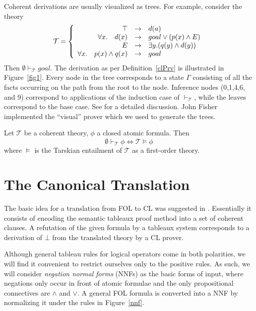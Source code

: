 \documentclass[a4paper,11pt]{article}
\begin{document}
\begin{ex}
Coherent derivations are usually visualized as trees.  For example, consider
the theory
\[ \mathcal T = \left\{
\begin{array}{r r l}
\top &\to &d(a)\\
\forall x.\quad d(x) &\to &goal \lor (p(x) \land E)\\
E &\to &\exists y. (q(y) \land d(y))\\
\forall x.\quad p(x) \land q(x) &\to &goal
\end{array}
\right.
\]
Then $\emptyset \vdash_{\mathcal T} goal$.  The derivation as per Definition~\ref{clPrv}
is illustrated in Figure~\ref{fig1}.  Every node in the tree corresponds to a state
$\Gamma$ consisting of all the facts occurring on the path from the root to the node. 
Inference nodes (0,1,4,6, and 9) correspond to applications of the induction case of 
$\vdash_{\mathcal T}$,
while the leaves correspond to the base case.  See \cite{FishBez09} for a detailed
discussion.
John Fisher implemented the ``visual'' prover which we used to generate the trees.
\end{ex}

\begin{fact}
Let $\mathcal T$ be a coherent theory, $\phi$ a closed atomic formula.  Then
\[\emptyset \vdash_{\mathcal T} \phi \iff \mathcal T \models \phi\]
where $\models$ is the Tarskian entailment of $\mathcal T$ as a first-order theory.
\end{fact}

\section{The Canonical Translation}

The basic idea for a translation from FOL to CL was suggested in \cite{Beze:Coqu:05}. 
Essentially it consists of encoding the semantic tableaux proof method 
\cite[pp.100--178]{HandbookAR} into a set of coherent clauses.  A refutation of the 
given formula
by a tableaux system corresponds to a derivation of $\bot$ from the translated
theory by a CL prover.

Although general tableau rules for logical operators come in both polarities, 
we will find it convenient to restrict ourselves
 only to the positive rules.  As such, we will consider \emph{negation
normal forms} (NNFs) as the basic forms of input, where negations only occur in
front of atomic formulae and the only propositional connectives are $\land$ and $\lor$.
A general FOL formula is converted into a NNF by normalizing it under
the rules in Figure~\ref{nnf}.
\end{document}
